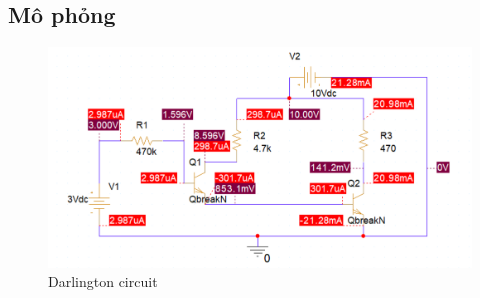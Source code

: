 \subsection{Mô phỏng}
\begin{figure}[ht]
    \centering
    \includegraphics[scale=0.3]{graphics/ex9/f2.png}
    \caption{Darlington circuit}
\end{figure}
\pagebreak